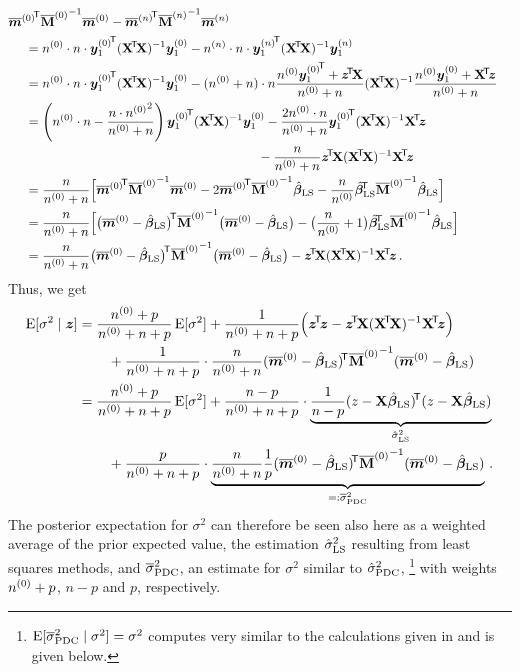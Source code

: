 \begin{align*}
\lefteqn{
    {\tmz}^\tra {\tMz}^{-1} \tmz
  - {\tmn}^\tra {\tMn}^{-1} \tmn } \hspace*{3ex} \\
 &= \nz \cdot n \cdot {\byz_1}^\tra (\XtX)^{-1} \byz_1
  - \nn \cdot n \cdot {\byn_1}^\tra (\XtX)^{-1} \byn_1 \\
 &= \nz \cdot n \cdot {\byz_1}^\tra (\XtX)^{-1} \byz_1
  - (\nz + n) \cdot n \frac{\nz {\byz_1}^\tra + \ztX}{\nz + n} (\XtX)^{-1} \frac{\nz \byz_1 + \Xtz}{\nz + n} \\
 &= \left(\nz \cdot n - \frac{n \cdot {\nz}^2}{\nz + n}\right) {\byz_1}^\tra (\XtX)^{-1} \byz_1
  - \frac{2\nz \cdot n}{\nz + n}                               {\byz_1}^\tra (\XtX)^{-1} \Xtz \\ & \hspace*{42ex}
  - \frac{n}{\nz + n}                                                   \ztX (\XtX)^{-1} \Xtz \\
 &= \frac{n}{\nz + n} \Big[               {\tmz}^\tra {\tMz}^{-1} \tmz
                           - 2            {\tmz}^\tra {\tMz}^{-1} \bls
                           -\frac{n}{\nz} {\bls}^\tra {\tMz}^{-1} \bls \Big] \\
 &= \frac{n}{\nz + n} \Big[ \big(\tmz - \bls\big)^\tra {\tMz}^{-1} \big(\tmz - \bls\big)
                           -\big(\frac{n}{\nz}+1\big)  {\bls}^\tra {\tMz}^{-1} \bls \Big] \\
 &= \frac{n}{\nz + n}       \big(\tmz - \bls\big)^\tra {\tMz}^{-1} \big(\tmz - \bls\big)
                           - \ztX (\XtX)^{-1} \Xtz\,.
\end{align*}
Thus, we get
\begin{align}
\E[\sigma^2\mid\z] &= \frac{\nz + p}{\nz + n + p} \E[\sigma^2]
                     +\frac{1}      {\nz + n + p} \Big( \ztz - \ztX (\XtX)^{-1} \Xtz \Big) \nonumber\\ & \hspace*{5ex}
                     +\frac{1}      {\nz + n + p} \cdot \frac{n}{\nz + n} (\tmz - \bls)^\tra {\tMz}^{-1} (\tmz - \bls) \nonumber\\
                   &= \frac{\nz + p}{\nz + n + p} \E[\sigma^2]
                     +\frac{n - p}  {\nz + n + p} \cdot \underbrace{\frac{1}{n-p} %
                                                          (z - \X\bls)^\tra (z - \X\bls)}_{\sls} \nonumber\\ & \hspace*{5ex}
                     +\frac{p}      {\nz + n + p} \cdot \underbrace{\frac{n}{\nz + n} %
                                                          \frac{1}{p} (\tmz - \bls)^\tra {\tMz}^{-1} (\tmz - \bls)}_{=:\tspdc}\,.
\label{equ:cccp-sigma2}
\end{align}
The posterior expectation for $\sigma^2$ can therefore be seen also here as
a weighted average of the prior expected value,
the estimation $\hat{\sigma}^2_\text{LS}$ resulting from least squares methods,
and $\overline{\sigma}^2_\text{PDC}$, an estimate for $\sigma^2$ similar to $\hat{\sigma}^2_\text{PDC}$,%
\footnote{$\operatorname{E}[\overline{\sigma}^2_\text{PDC}\mid\sigma^2]=\sigma^2$ computes very similar to the
calculations given in \textcite[p.~249]{1994:ohagan} and is given below.}
with weights $n^{(0)} + p$, $n-p$ and $p$, respectively.

